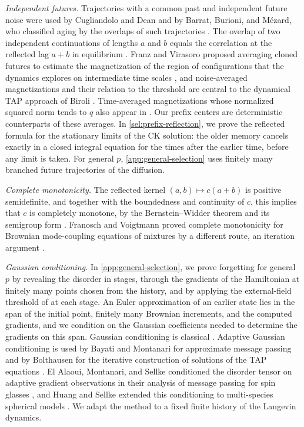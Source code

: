 \emph{Independent futures.} Trajectories with a common past and independent future noise were used by Cugliandolo and Dean \cite[arXiv version~1, Section~II]{cugliandolodean1995} and by Barrat, Burioni, and M\'ezard, who classified aging by the overlaps of such trajectories \cite[Section~2]{bbm1996}. The overlap of two independent continuations of lengths $a$ and $b$ equals the correlation at the reflected lag $a+b$ in equilibrium \cite[Section~2, Equation~(9)]{bbm1996}. Franz and Virasoro proposed averaging cloned futures to estimate the magnetization of the region of configurations that the dynamics explores on intermediate time scales \cite[arXiv version~3, Section~III]{franzvirasoro2000}, and noise-averaged magnetizations and their relation to the threshold are central to the dynamical TAP approach of Biroli \cite[arXiv version~2, Section~III.B]{biroli1999}. Time-averaged magnetizations whose normalized squared norm tends to $q$ also appear in \cite[arXiv version~1, Section~5.1, Equation~(5.1.9)]{ck1994}. Our prefix centers are deterministic counterparts of these averages. In \cref{sel:prefix-reflection}, we prove the reflected formula for the stationary limits of the CK solution: the older memory cancels exactly in a closed integral equation for the times after the earlier time, before any limit is taken. For general $p$, \cref{app:general-selection} uses finitely many branched future trajectories of the diffusion.

\emph{Complete monotonicity.} The reflected kernel $(a,b)\mapsto c(a+b)$ is positive semidefinite, and together with the boundedness and continuity of $c$, this implies that $c$ is completely monotone, by the Bernstein--Widder theorem and its semigroup form \cite{widder1941,bcr1984}. Franosch and Voigtmann proved complete monotonicity for Brownian mode-coupling equations of mixtures by a different route, an iteration argument \cite[arXiv version~1, Section~III]{fv2002}.

\emph{Gaussian conditioning.} In \cref{app:general-selection}, we prove forgetting for general $p$ by revealing the disorder in stages, through the gradients of the Hamiltonian at finitely many points chosen from the history, and by applying the external-field threshold of \cite[Theorem~1 and Corollary~1.8]{hs2023} at each stage. An Euler approximation of an earlier state lies in the span of the initial point, finitely many Brownian increments, and the computed gradients, and we condition on the Gaussian coefficients needed to determine the gradients on this span. Gaussian conditioning is classical \cite{janson1997}. Adaptive Gaussian conditioning is used by Bayati and Montanari for approximate message passing \cite[arXiv version~4, Section~3.8]{bayatimontanari2011} and by Bolthausen for the iterative construction of solutions of the TAP equations \cite[Section~3]{bolthausen2014}. El Alaoui, Montanari, and Sellke conditioned the disorder tensor on adaptive gradient observations in their analysis of message passing for spin glasses \cite[arXiv version~1, Appendix~A]{eams2021}, and Huang and Sellke extended this conditioning to multi-species spherical models \cite[Appendix~A]{hs2024amp}. We adapt the method to a fixed finite history of the Langevin dynamics.


